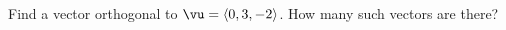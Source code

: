 \begin{activity} \label{A:9.3.6}  Find a vector orthogonal to $\vu = \langle 0, 3, -2 \rangle$. How many such vectors are there?
\end{activity}
\begin{smallhint}

\end{smallhint}
\begin{bighint}

\end{bighint}
\begin{activitySolution}

\end{activitySolution}
\aftera
